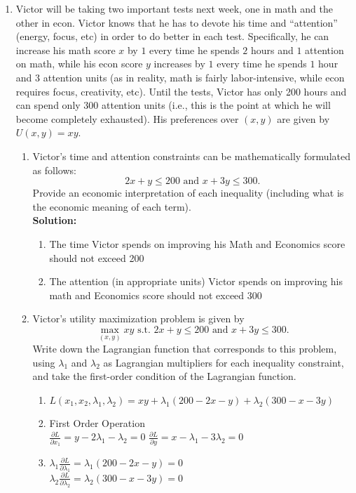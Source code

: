 \documentclass[11pt]{article}
\begin{document}
\begin{enumerate}
\item Victor will be taking two important tests next week, one in math and the other in econ. Victor knows that he has to devote his time and ``attention'' (energy, focus, etc) in order to do better in each test. Specifically, he can increase his math score $x$ by $1$ every time he spends $2$ hours and $1$ attention on math, while his econ score $y$ increases by $1$ every time he spends $1$ hour and $3$ attention units (as in reality, math is fairly labor-intensive, while econ requires focus, creativity, etc). Until the tests, Victor has only 200 hours and can spend only 300 attention units (i.e., this is the point at which he will become completely exhausted). His preferences over $(x,y)$ are given by $U(x,y)=xy$.
    \begin{enumerate}
        \item Victor's time and attention constraints can be mathematically formulated as follows:
            \begin{equation*}
                2x+y\leq 200\text{ and }x+3y\leq 300.
            \end{equation*}
        Provide an economic interpretation of each inequality (including what is the economic meaning of each term).\\
        \textbf{Solution:}
            \begin{enumerate}
                \item The time Victor spends on improving his Math and Economics score should not exceed 200
                \item The attention (in appropriate units) Victor spends on improving his math and Economics score should not exceed 300
            \end{enumerate}

        \item Victor's utility maximization problem is given by
        \begin{equation*}
            \max_{(x,y)}xy\text{ s.t. }2x+y\leq 200\text{ and }x+3y\leq 300.
        \end{equation*}
        Write down the Lagrangian function that corresponds to this problem, using $\lambda_{1}$ and $\lambda_{2}$ as Lagrangian multipliers for each inequality constraint, and take the first-order condition of the Lagrangian function.
        
        \begin{enumerate}
            \item $L(x_1, x_2, \lambda_1, \lambda_2) = xy + \lambda_1(200-2x-y) + \lambda_2(300-x-3y)$
            \item First Order Operation\\
            $\frac{\partial L}{\partial x_1} = y - 2\lambda_1 - \lambda_2 = 0$
            $\frac{\partial L}{\partial y} = x - \lambda_1 - 3\lambda_2 = 0$
            \item $\lambda_1 \frac{\partial L}{\partial \lambda_1} = \lambda_1(200-2x-y) = 0$\\
            $\lambda_2 \frac{\partial L}{\partial \lambda_2} = \lambda_2(300-x-3y) = 0$
        \end{enumerate}


\end{enumerate}
\end{enumerate}
\end{document}
